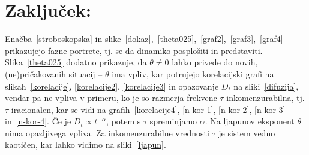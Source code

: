 \documentclass[a4paper, 12pt]{article}
\begin{document}
\section{Zaklju\v cek:}

Ena\v cba~\eqref{stroboskopska} in slike~\ref{dokaz},~\ref{theta025},~\ref{graf2},~\ref{graf3},~\ref{graf4} prikazujejo
fazne portrete, tj. se da dinamiko posplo\v siti in predstaviti. Slika~\ref{theta025} dodatno prikazuje, da $\theta \neq 0$
lahko privede do novih, (ne)pri\v cakovanih situacij -- $\theta$ ima vpliv, kar potrujejo korelacijski grafi na
slikah~\ref{korelacije}, \ref{korelacije2}, \ref{korelacije3} in opazovanje $D_t$ na
sliki~\ref{difuzija}, vendar pa ne vpliva v primeru, ko je so razmerja frekvenc $\tau$ inkomenzurabilna, tj. $\tau$
iracionalen, kar se vidi na grafih~\ref{korelacije4}, \ref{n-kor-1}, \ref{n-kor-2}, \ref{n-kor-3} in~\ref{n-kor-4}.
\v Ce je $D_t \propto t^{-\alpha}$, potem s $\tau$ spreminjamo $\alpha$. Na ljapunov eksponent
$\theta$ nima opazljivega vpliva. Za inkomenzurabilne vrednosti $\tau$ je sistem vedno kaoti\v cen, kar lahko vidimo
na sliki~\ref{ljapun}.
\end{document}
